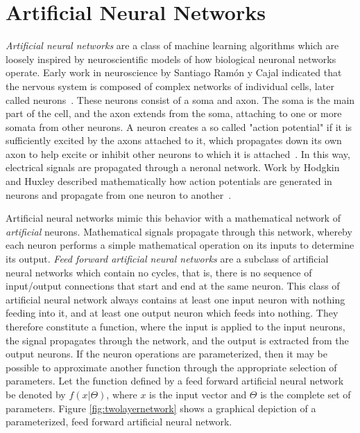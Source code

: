 \chapter{Artificial Neural Networks}
\label{chap:neuralnetworks}

\textit{Artificial neural networks} are a class of machine learning algorithms which are loosely inspired by neuroscientific models of how biological neuronal networks operate.
Early work in neuroscience by Santiago Ram{\'o}n y Cajal indicated that the nervous system is composed of complex networks of individual cells, later called neurons~\cite{cajal1955}.
These neurons consist of a soma and axon.
The soma is the main part of the cell, and the axon extends from the soma, attaching to one or more somata from other neurons.
A neuron creates a so called "action potential" if it is sufficiently excited by the axons attached to it, which propagates down its own axon to help excite or inhibit other neurons to which it is attached~\cite{mcculloch1943}.
In this way, electrical signals are propagated through a neronal network.
Work by Hodgkin and Huxley described mathematically how action potentials are generated in neurons and propagate from one neuron to another~\cite{hodgkin1952}.

Artificial neural networks mimic this behavior with a mathematical network of \textit{artificial} neurons.
Mathematical signals propagate through this network, whereby each neuron performs a simple mathematical operation on its inputs to determine its output.
\textit{Feed forward artificial neural networks} are a subclass of artificial neural networks which contain no cycles, that is, there is no sequence of input/output connections that start and end at the same neuron.
This class of artificial neural network always contains at least one input neuron with nothing feeding into it, and at least one output neuron which feeds into nothing.
They therefore constitute a function, where the input is applied to the input neurons, the signal propagates through the network, and the output is extracted from the output neurons.
If the neuron operations are parameterized, then it may be possible to approximate another function through the appropriate selection of parameters.
Let the function defined by a feed forward artificial neural network be denoted by $f(x|\Theta)$, where $x$ is the input vector and $\Theta$ is the complete set of parameters.
Figure \ref{fig:twolayernetwork} shows a graphical depiction of a parameterized, feed forward artificial neural network.

